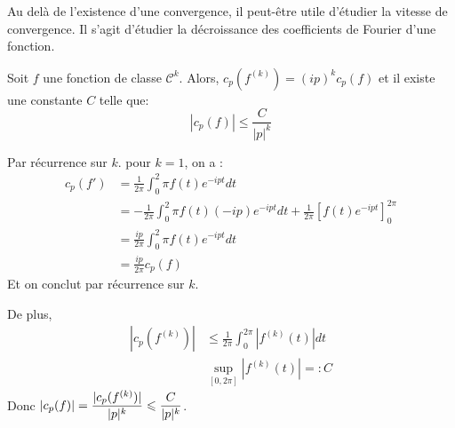 	
			
	Au delà de l'existence d'une convergence, il peut-être utile d'étudier la vitesse de convergence. Il s'agit d'étudier la décroissance des coefficients de Fourier d'une fonction. 
	
	\begin{mythm}
		Soit $f$ une fonction de classe $\mathcal{C}^k$. Alors, $c_p(f^{(k)}) = (ip)^kc_p(f)$ et il existe une constante $C$ telle que:
			$$ | c_p(f) | \leqslant \frac{C}{|p|^k} $$
	\end{mythm}
	
	\begin{myproof}
		Par récurrence sur $k$. 
		pour $k=1$, on a :
			\begin{align*}
			c_p(f') &= \frac{1}{2\pi}\int_0^2\pi f(t)e^{-ipt}dt \\
					&= -\frac{1}{2\pi}\int_0^2\pi f(t)(-ip) e^{-ipt}dt + \frac{1}{2\pi}\left[f(t)e^{-ipt} \right]_0^{2\pi} \\
					& = \frac {ip}{2\pi} \int_0^2\pi f(t)e^{-ipt}dt \\
					& = \frac {ip}{2\pi} c_p(f)
			\end{align*}
			Et on conclut par récurrence sur $k$.
		
		De plus, 
		\begin{align*}
		|c_p(f^{(k)})| &\leqslant \frac{1}{2\pi}\int_0^{2\pi}|f^{(k)}(t)|dt \\
		& \sup_{[0, 2\pi]} |f^{(k)}(t)| =: C 
		\end{align*}
		Donc $ \displaystyle|c_p(f)| = \frac {|c_p(f^{(k)})|}{|p|^k} \leqslant \frac{C}{|p|^k} $.
		\cqfd		
	\end{myproof}
		
